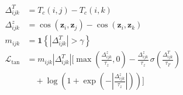 \documentclass[border=1pt]{standalone}
\begin{document}
\color[HTML]{1F3342}
\(\displaystyle
\begin{aligned}
\Delta^T_{ijk}
&=T_c(i,j)-T_c(i,k)\\
\Delta^z_{ijk}
&=\cos(\mathbf{z}_i,\mathbf{z}_j)-\cos(\mathbf{z}_i,\mathbf{z}_k)\\
m_{ijk}
&=\mathbf{1}\!\left\{|\Delta^T_{ijk}|>\gamma\right\}\\
\mathcal{L}_{\mathrm{tan}}
&=m_{ijk}|\Delta^T_{ijk}|\Bigg[
\max\!\left(\frac{\Delta^z_{ijk}}{\tau_z},0\right)
-\frac{\Delta^z_{ijk}}{\tau_z}\,
\sigma\!\left(\frac{\Delta^T_{ijk}}{\tau_T}\right)\\
&\quad + \log\!\left(1+\exp\!\left(
-\left|\frac{\Delta^z_{ijk}}{\tau_z}\right|\right)\right)
\Bigg]
\end{aligned}
\)
\end{document}
